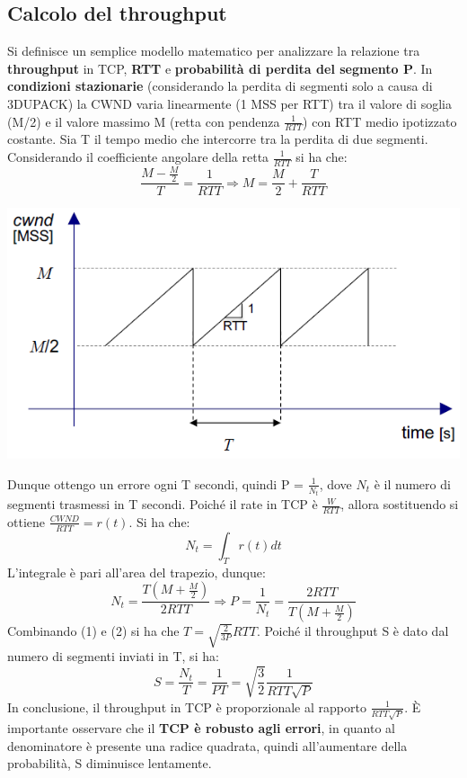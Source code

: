 \documentclass[12pt]{article}
\begin{document}
\subsection{Calcolo del throughput}

Si definisce un semplice modello matematico per analizzare la relazione tra \textbf{throughput} in TCP, \textbf{RTT} e \textbf{probabilità di perdita del segmento P}. In \textbf{condizioni stazionarie} (considerando la perdita di segmenti solo a causa di 3DUPACK) la CWND varia linearmente (1 MSS per RTT) tra il valore di soglia (M/2) e il valore massimo M (retta con pendenza $\frac{1}{RTT}$) con RTT medio ipotizzato costante. Sia T il tempo medio che intercorre tra la perdita di due segmenti. Considerando il coefficiente angolare della retta $\frac{1}{RTT}$ si ha che:
\begin{equation}
    \frac{M - \frac{M}{2}}{T} = \frac{1}{RTT} \Rightarrow M = \frac{M}{2} + \frac{T}{RTT}
\end{equation}
\begin{center}
    \includegraphics[scale=0.6]{tcp_throughput}
\end{center}
Dunque ottengo un errore ogni T secondi, quindi P = $\frac{1}{N_t}$, dove $N_t$ è il numero di segmenti trasmessi in T secondi. Poiché il rate in TCP è $\frac{W}{RTT}$, allora sostituendo si ottiene $\frac{CWND}{RTT} = r(t)$. Si ha che:
\begin{equation*}
    N_t = \int_{T} r(t) dt
\end{equation*}
L'integrale è pari all'area del trapezio, dunque:
\begin{equation}
    N_t = \frac{T(M + \frac{M}{2})}{2RTT} \Rightarrow P = \frac{1}{N_t} = \frac{2RTT}{T(M + \frac{M}{2})}
\end{equation}
Combinando (1) e (2) si ha che $T = \sqrt{\frac{2}{3P}}RTT$. Poiché il throughput S è dato dal numero di segmenti inviati in T, si ha:
\begin{equation*}
    S = \frac{N_t}{T} = \frac{1}{PT} = \sqrt{\frac{3}{2}}\frac{1}{RTT\sqrt{P}}
\end{equation*}
In conclusione, il throughput in TCP è proporzionale al rapporto $\frac{1}{RTT\sqrt{P}}$. È importante osservare che il \textbf{TCP è robusto agli errori}, in quanto al denominatore è presente una radice quadrata, quindi all'aumentare della probabilità, S diminuisce lentamente.
\end{document}
